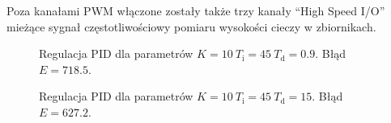Poza kanałami PWM włączone zostały także trzy kanały ``High Speed I/O'' mieżące sygnał częstotliwościowy pomiaru wysokości cieczy w zbiornikach.

\begin{figure}[ht]
\centering

\caption{Regulacja PID dla parametrów $K = 10 ~ T_\mathrm{i} = 45 ~ T_\mathrm{d} = \num{0.9}$. Błąd $E = \num{718.5}$.}
\label{R8}
\end{figure}

\begin{figure}[ht]
\centering

\caption{Regulacja PID dla parametrów $K = 10 ~ T_\mathrm{i} = 45 ~ T_\mathrm{d} = \num{15}$. Błąd $E = \num{627.2}$.}
\label{R9}
\end{figure}
